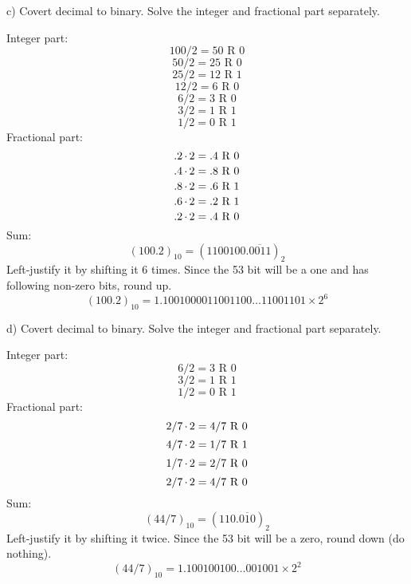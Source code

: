 \begin{task}{c)}
Covert decimal to binary. Solve the integer and fractional part separately.

Integer part:
\[100/2=50\text{ R }0\]
\[50/2=25\text{ R }0\]
\[25/2=12\text{ R }1\]
\[12/2=6\text{ R }0\]
\[6/2=3\text{ R }0\]
\[3/2=1\text{ R }1\]
\[1/2=0\text{ R }1\]
Fractional part:
\[.2\operatorname{\cdot}2=.4\text{ R }0\]
\[.4\operatorname{\cdot}2=.8\text{ R }0\]
\[.8\operatorname{\cdot}2=.6\text{ R }1\]
\[.6\operatorname{\cdot}2=.2\text{ R }1\]
\[.2\operatorname{\cdot}2=.4\text{ R }0\]
Sum:
\[(100.2)_{10}=(1100100.\overline{0011})_2\]
Left-justify it by shifting it 6 times. Since the 53 bit will be a one and has following non-zero bits, round up.
\[(100.2)_{10}=1.1001000011001100\ldots11001101 \times 2^{6}\]
\end{task}

\begin{task}{d)}
Covert decimal to binary. Solve the integer and fractional part separately.

Integer part:
\[6/2=3\text{ R }0\]
\[3/2=1\text{ R }1\]
\[1/2=0\text{ R }1\]
Fractional part:
\[2/7\operatorname{\cdot}2=4/7\text{ R }0\]
\[4/7\operatorname{\cdot}2=1/7\text{ R }1\]
\[1/7\operatorname{\cdot}2=2/7\text{ R }0\]
\[2/7\operatorname{\cdot}2=4/7\text{ R }0\]
Sum:
\[(44/7)_{10}=(110.\overline{010})_2\]
Left-justify it by shifting it twice. Since the 53 bit will be a zero, round down (do nothing).
\[(44/7)_{10}=1.100100100\ldots001001 \times 2^{2}\]
\end{task}